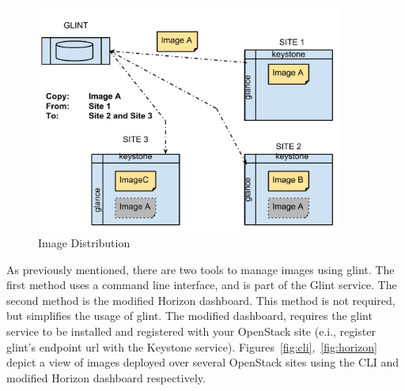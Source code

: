\documentclass[a4paper]{jpconf}
\begin{document}
\begin{figure}[H]
\begin{center}
\includegraphics[width=24pc]{images/archglint.pdf}
\caption{\label{fig:glintfigure}Image Distribution }
\end{center}
\end{figure}

As previously mentioned, there are two tools to manage images using glint. The first method uses a command line interface, and is part of the Glint service. The second method is the modified Horizon dashboard. This method is not required, but simplifies the usage of glint. The modified dashboard, requires the glint service to be installed and registered with your OpenStack site (e.i., register glint's endpoint url with the Keystone service). Figures~\ref{fig:cli},~\ref{fig:horizon} depict a view of images deployed over several OpenStack sites using the CLI and modified Horizon dashboard respectively.
\end{document}
